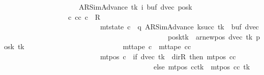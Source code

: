 \begin{isabellebody}
\ \ \ \ \ \ \ \ \ \ \ \ \ \ \ \ \ \ \ \ \ {\isacharparenleft}{\kern0pt}AR{\isacharunderscore}{\kern0pt}SimAdvance{\isacharcomma}{\kern0pt}\ tk{\isacharcomma}{\kern0pt}\ i{\isacharcomma}{\kern0pt}\ buf{\isacharcomma}{\kern0pt}\ dvec{\isacharcomma}{\kern0pt}\ posk{\isacharparenright}{\kern0pt}\ {\isasymrbrakk}\isanewline
\ \ \ \ \ \ \ \ \ \ \ \ \ \ \ \ \ {\isasymLongrightarrow}\ {\isasymexists}c{\isacharprime}{\kern0pt}{\isacharprime}{\kern0pt}{\isachardot}{\kern0pt}\ {\isacharparenleft}{\kern0pt}cc{\isacharcomma}{\kern0pt}\ c{\isacharprime}{\kern0pt}{\isacharprime}{\kern0pt}{\isacharparenright}{\kern0pt}\ {\isasymin}\ R{\isacharprime}{\kern0pt}\isanewline
\ \ \ \ \ \ \ \ \ \ \ \ \ \ \ \ \ \ \ \ \ \ \ \ \ \ {\isasymand}\ mt{\isacharunderscore}{\kern0pt}state\ c{\isacharprime}{\kern0pt}{\isacharprime}{\kern0pt}\ {\isacharequal}{\kern0pt}\ {\isacharparenleft}{\kern0pt}q{\isacharcomma}{\kern0pt}\ AR{\isacharunderscore}{\kern0pt}SimAdvance{\isacharcomma}{\kern0pt}\ k{\isacharunderscore}{\kern0pt}succ\ tk{\isacharcomma}{\kern0pt}\ {}{\isacharcomma}{\kern0pt}\ buf{\isacharcomma}{\kern0pt}\ dvec{\isacharcomma}{\kern0pt}\isanewline
\ \ \ \ \ \ \ \ \ \ \ \ \ \ \ \ \ \ \ \ \ \ \ \ \ \ \ \ \ \ \ \ \ \ \ \ \ \ \ \ \ \ \ \ \ \ posk{\isacharparenleft}{\kern0pt}tk\ {\isacharcolon}{\kern0pt}{\isacharequal}{\kern0pt}\ ar{\isacharunderscore}{\kern0pt}newpos\ {\isacharparenleft}{\kern0pt}dvec\ tk{\isacharparenright}{\kern0pt}\ {\isacharparenleft}{\kern0pt}posk\ tk{\isacharparenright}{\kern0pt}{\isacharparenright}{\kern0pt}{\isacharparenright}{\kern0pt}\isanewline
\ \ \ \ \ \ \ \ \ \ \ \ \ \ \ \ \ \ \ \ \ \ \ \ \ \ {\isasymand}\ mt{\isacharunderscore}{\kern0pt}tape\ c{\isacharprime}{\kern0pt}{\isacharprime}{\kern0pt}\ {\isacharequal}{\kern0pt}\ mt{\isacharunderscore}{\kern0pt}tape\ cc\isanewline
\ \ \ \ \ \ \ \ \ \ \ \ \ \ \ \ \ \ \ \ \ \ \ \ \ \ {\isasymand}\ mt{\isacharunderscore}{\kern0pt}pos\ c{\isacharprime}{\kern0pt}{\isacharprime}{\kern0pt}\ {\isacharequal}{\kern0pt}\ {\isacharparenleft}{\kern0pt}if\ dvec\ tk\ {\isacharequal}{\kern0pt}\ dir{\isachardot}{\kern0pt}R\ then\ mt{\isacharunderscore}{\kern0pt}pos\ cc\isanewline
\ \ \ \ \ \ \ \ \ \ \ \ \ \ \ \ \ \ \ \ \ \ \ \ \ \ \ \ \ \ \ \ \ \ \ \ \ \ \ \ \ \ else\ {\isacharparenleft}{\kern0pt}mt{\isacharunderscore}{\kern0pt}pos\ cc{\isacharparenright}{\kern0pt}{\isacharparenleft}{\kern0pt}tk\ {\isacharcolon}{\kern0pt}{\isacharequal}{\kern0pt}\ mt{\isacharunderscore}{\kern0pt}pos\ cc\ tk\ {\isacharminus}{\kern0pt}\ {}{\isacharparenright}{\kern0pt}{\isacharparenright}{\kern0pt}{\isachardoublequoteclose}\isanewline

\end{isabellebody}
